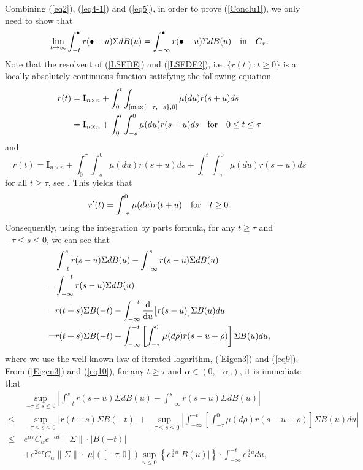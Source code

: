 \documentclass[preprint,12pt]{elsarticle}
\begin{document}
Combining (\ref{eq2}), (\ref{eq4-1}) and (\ref{eq5}), in order to prove (\ref{Conclu1}), we only need to show that
\begin{equation}\label{eq6}
\lim_{t\rightarrow\infty}\int_{-t}^\bullet r(\bullet-u)\Sigma dB(u)=\int_{-\infty}^{\bullet}r(\bullet-u)\Sigma dB(u)\quad {\rm in}\quad C_\tau.
\end{equation}
Note that the resolvent of  (\ref{LSFDE}) and (\ref{LSFDE2}), i.e. $\{r(t):t\geq0\}$ is a locally absolutely continuous function satisfying the following equation
\begin{align}\label{eq7}
r(t)&=\mathbf{I}_{n\times n}+\int_0^t\int_{[\max\{-\tau,-s\},0]}\mu(du)r(s+u)ds\nonumber\\
&=\mathbf{I}_{n\times n}+\int_0^t\int_{-s}^0\mu(du)r(s+u)ds\quad {\rm for}\quad0\leq t\leq\tau
\end{align}
and
\begin{equation}\label{eq8}
r(t)=\mathbf{I}_{n\times n}+\int_0^\tau\int_{-s}^0\mu(du)r(s+u)ds+\int_\tau^t\int_{-\tau}^0\mu(du)r(s+u)ds
\end{equation}
for all $t\geq\tau$, see \cite{AMW}. This yields that
\begin{equation}\label{eq9}
r'(t)=\int_{-\tau}^0\mu(du)r(t+u)\quad {\rm for}\quad t\geq0.
\end{equation}
Consequently, using the integration by parts formula, for any $t\geq\tau$ and $-\tau\leq s\leq0$, we can see that
\begin{align}\label{eq10}
&\int_{-t}^s r(s-u)\Sigma dB(u)-\int_{-\infty}^{s}r(s-u)\Sigma dB(u)\nonumber\\
=&\int_{-\infty}^{-t} r(s-u)\Sigma dB(u)\nonumber\\
=&r(t+s)\Sigma B(-t)-\int_{-\infty}^{-t}\frac{\rm d}{{\rm d}u}\bigl[r(s-u)\bigr]\Sigma B(u)du\nonumber\\
=&r(t+s)\Sigma B(-t)+\int_{-\infty}^{-t}\left[\int_{-\tau}^0\mu(d\rho)r(s-u+\rho)\right]\Sigma B(u)du,
\end{align}
where we use the well-known law of iterated logarithm, (\ref{Eigen3}) and (\ref{eq9}).
From (\ref{Eigen3}) and (\ref{eq10}), for any $t\geq\tau$ and $\alpha\in(0,-\alpha_0)$, it is immediate that
\begin{align}\label{eq10-1}
&\sup_{-\tau\leq s\leq0}\left|\int_{-t}^s r(s-u)\Sigma dB(u)-\int_{-\infty}^{s}r(s-u)\Sigma dB(u)\right|\nonumber\\
\leq&\sup_{-\tau\leq s\leq0}\left|r(t+s)\Sigma B(-t)\right|+\sup_{-\tau\leq s\leq0}\left|\int_{-\infty}^{-t}\left[\int_{-\tau}^0\mu(d\rho)r(s-u+\rho)\right]\Sigma B(u)du\right|\nonumber\\
\leq&e^{\alpha\tau}C_\alpha e^{-\alpha t}\|\Sigma\|\cdot|B(-t)|\nonumber\\
\quad&+e^{2\alpha\tau}C_\alpha\|\Sigma\|\cdot|\mu|([-\tau,0])\sup_{u\leq0}\left\{e^{\frac\alpha2u}|B(u)|\right\}\cdot\int_{-\infty}^{-t}e^{\frac\alpha2u}du,
\end{align}
\end{document}

